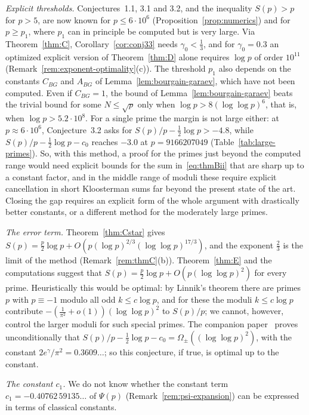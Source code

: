 \textit{Explicit thresholds.} Conjectures~1.1, 3.1 and 3.2, and the inequality $S(p)>p$ for $p>5$, are now known for $p\le 6\cdot 10^6$ (Proposition~\ref{prop:numerics}) and for $p\ge p_1$, where $p_1$ can in principle be computed but is very large. Via Theorem~\ref{thm:C}, Corollary~\ref{cor:conj33} needs $\gamma_0<\frac13$, and for $\gamma_0=0.3$ an optimized explicit version of Theorem~\ref{thm:D} alone requires $\log p$ of order $10^{11}$ (Remark~\ref{rem:exponent-optimality}(c)). The threshold $p_1$ also depends on the constants $C_{BG}$ and $A_{BG}$ of Lemma~\ref{lem:bourgain-garaev}, which have not been computed. Even if $C_{BG}=1$, the bound of Lemma~\ref{lem:bourgain-garaev} beats the trivial bound for some $N\le\sqrt p$ only when $\log p>8(\log\log p)^6$, that is, when $\log p>5.2\cdot10^8$. For a single prime the margin is not large either: at $p\approx6\cdot10^6$, Conjecture~3.2 asks for $S(p)/p-\frac12\log p>-4.8$, while $S(p)/p-\frac12\log p-c_0$ reaches $-3.0$ at $p=9166207049$ (Table~\ref{tab:large-primes}). So, with this method, a proof for the primes just beyond the computed range would need explicit bounds for the sum in~\eqref{eq:thmBii} that are sharp up to a constant factor, and in the middle range of moduli these require explicit cancellation in short Kloosterman sums far beyond the present state of the art. Closing the gap requires an explicit form of the whole argument with drastically better constants, or a different method for the moderately large primes.

\textit{The error term.} Theorem~\ref{thm:Cstar} gives $S(p)=\frac p2\log p+O(p(\log p)^{2/3}(\log\log p)^{17/3})$, and the exponent $\frac23$ is the limit of the method (Remark~\ref{rem:thmC}(b)). Theorem~\ref{thm:E} and the computations suggest that $S(p)=\frac p2\log p+O(p(\log\log p)^2)$ for every prime. Heuristically this would be optimal: by Linnik's theorem there are primes $p$ with $p\equiv -1$ modulo all odd $k\le c\log p$, and for these the moduli $k\le c\log p$ contribute $-(\frac{1}{\pi^2}+o(1))(\log\log p)^2$ to $S(p)/p$; we cannot, however, control the larger moduli for such special primes. The companion paper~\cite[Theorem~3]{b32} proves unconditionally that $S(p)/p-\frac12\log p-c_0=\Omega_\pm((\log\log p)^2)$, with the constant $2e^\gamma/\pi^2=0.3609\ldots$; so this conjecture, if true, is optimal up to the constant.

\textit{The constant $c_1$.} We do not know whether the constant term $c_1=-0.40762\,59135\ldots$ of $\Psi(p)$ (Remark~\ref{rem:psi-expansion}) can be expressed in terms of classical constants.

